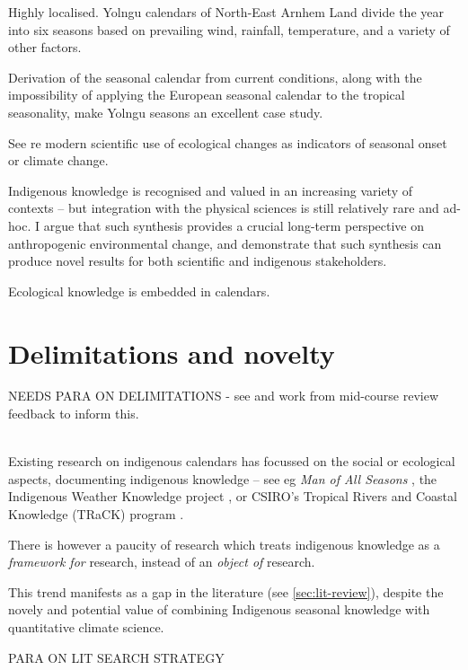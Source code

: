 Highly localised.
Yolngu calendars of North-East Arnhem Land divide the year into
six seasons based on prevailing wind, rainfall, temperature,
and a variety of other factors.

Derivation of the seasonal calendar from current conditions,
along with the impossibility of applying the European seasonal calendar
to the tropical seasonality, make Yolngu seasons an excellent case study.

See \citet{menzel2006} re modern scientific use of ecological changes
as indicators of seasonal onset or climate change.



Indigenous knowledge is recognised and valued in an increasing variety
of contexts \citep[eg.][]{petheram2010,cochran2015,berkes2012} –
but integration with the physical sciences is still relatively rare and ad-hoc.
%
I argue that such synthesis provides a crucial long-term perspective on
anthropogenic environmental change, and demonstrate that such synthesis
can produce novel results for both scientific and indigenous stakeholders.

Ecological knowledge is embedded in calendars.



\section{Delimitations and novelty}

NEEDS PARA ON DELIMITATIONS - see and work from mid-course review feedback to inform this.

~\\

Existing research on indigenous calendars has focussed on the social or ecological aspects,
documenting indigenous knowledge – see eg \textit{Man of All Seasons} \citep{davis1989},
the Indigenous Weather Knowledge project \citet{BOM-iwk},
or CSIRO’s Tropical Rivers and Coastal Knowledge (TRaCK) program \citep{CSIROcals,oconnor2010}.

There is however a paucity of research which treats indigenous knowledge
as a \emph{framework for} research, instead of an \emph{object of} research.

This trend manifests as a gap in the literature (see \autoref{sec:lit-review}),
despite the novely and potential value of combining Indigenous seasonal knowledge
with quantitative climate science.

PARA ON LIT SEARCH STRATEGY

